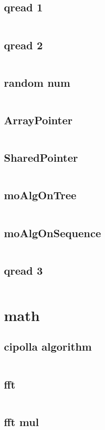   \subsection{qread 1}
    \inputminted{cpp}{../code/utility/qread_1.cpp}
  \subsection{qread 2}
    \inputminted{cpp}{../code/utility/qread_2.cpp}
  \subsection{random num}
    \inputminted{cpp}{../code/utility/random_num.cpp}
  \subsection{ArrayPointer}
    \inputminted{cpp}{../code/utility/ArrayPointer.cpp}
  \subsection{SharedPointer}
    \inputminted{cpp}{../code/utility/SharedPointer.cpp}
  \subsection{moAlgOnTree}
    \inputminted{cpp}{../code/utility/moAlgOnTree.cpp}
  \subsection{moAlgOnSequence}
    \inputminted{cpp}{../code/utility/moAlgOnSequence.cpp}
  \subsection{qread 3}
    \inputminted{cpp}{../code/utility/qread_3.cpp}
\section{math}
  \subsection{cipolla algorithm}
    \inputminted{cpp}{../code/math/cipolla_algorithm.cpp}
  \subsection{fft}
    \inputminted{cpp}{../code/math/fft.cpp}
  \subsection{fft mul}
    \inputminted{cpp}{../code/math/fft_mul.cpp}
